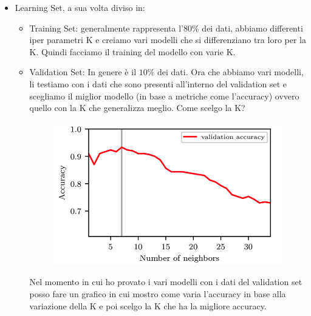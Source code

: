 \documentclass[14pt]{extreport}
\begin{document}
\begin{itemize}
	\item Learning Set, a sua volta diviso in:
	      \begin{itemize}
		      \item Training Set: generalmente rappresenta l’$80\%$ dei dati, abbiamo differenti iper parametri K e creiamo vari modelli che si
		      differenziano tra loro per la K. Quindi facciamo il training del modello con varie K.
		      \item Validation Set: In genere è il $10\%$ dei dati. Ora che abbiamo vari modelli, li testiamo con i dati che sono presenti all’interno
		            del validation set e scegliamo il miglior modello (in base a metriche come l’accuracy) ovvero quello con la K che generalizza
		            meglio. Come scelgo la K?

		            \begin{figure}[H]
			            \centering
			            \includegraphics[width=0.7\linewidth]{454.jpeg}
		            \end{figure}
		            Nel momento in cui ho provato i vari modelli con i dati del validation set posso fare un grafico in cui mostro come varia
		            l’accuracy in base alla variazione della K e poi scelgo la K che ha la migliore accuracy.


\end{itemize}
\end{itemize}
\end{document}
